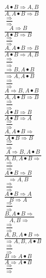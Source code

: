 \documentclass[11pt]{article}
\begin{document}
\begin{center}

$\frac{A\bullet B\Rightarrow A, B}{A, A\bullet B\Rightarrow B}$
\bigskip
\\$\frac{\Rightarrow }{\Rightarrow }$
\bigskip
\\$\frac{A\Rightarrow B}{A\bullet B\Rightarrow B}$
\bigskip
\\$\frac{\Rightarrow }{\Rightarrow }$
\bigskip
\\$\frac{A, A\bullet B\Rightarrow B}{A\bullet B\Rightarrow A, B}$
\bigskip
\\$\frac{\Rightarrow }{\Rightarrow }$
\bigskip
\\$\frac{\Rightarrow B, A\bullet B}{\Rightarrow A, A\bullet B}$
\bigskip
\\$\frac{\Rightarrow }{\Rightarrow }$
\bigskip
\\$\frac{A\Rightarrow B, A\bullet B}{A, A\bullet B\Rightarrow B}$
\bigskip
\\$\frac{\Rightarrow }{\Rightarrow }$
\bigskip
\\$\frac{A\bullet B\Rightarrow B}{A\bullet B\Rightarrow A}$
\bigskip
\\$\frac{\Rightarrow }{\Rightarrow }$
\bigskip
\\$\frac{A, A\bullet B\Rightarrow }{A\bullet B\Rightarrow B}$
\bigskip
\\$\frac{\Rightarrow }{\Rightarrow }$
\bigskip
\\$\frac{A\Rightarrow B, A\bullet B}{A, B, A\bullet B\Rightarrow }$
\bigskip
\\$\frac{\Rightarrow }{\Rightarrow }$
\bigskip
\\$\frac{A\bullet B\Rightarrow B}{\Rightarrow A, B}$
\bigskip
\\$\frac{\Rightarrow }{\Rightarrow }$
\bigskip
\\$\frac{A\bullet B\Rightarrow A}{B\Rightarrow A}$
\bigskip
\\$\frac{\Rightarrow }{\Rightarrow }$
\bigskip
\\$\frac{B, A\bullet B\Rightarrow }{A, B\Rightarrow }$
\bigskip
\\$\frac{\Rightarrow }{\Rightarrow }$
\bigskip
\\$\frac{A, B, A\bullet B\Rightarrow }{\Rightarrow A, B, A\bullet B}$
\bigskip
\\$\frac{\Rightarrow }{\Rightarrow }$
\bigskip
\\$\frac{B\Rightarrow A\bullet B}{A\Rightarrow A\bullet B}$
\bigskip
\\$\frac{\Rightarrow }{\Rightarrow }$

\end{center}
\end{document}
